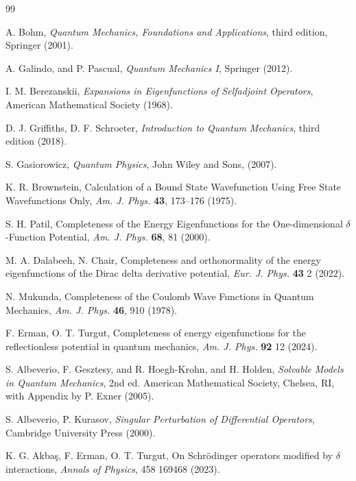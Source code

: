 \documentclass[amsmath,amssymb,14pt]{article}
\numberwithin{equation}{section}
\begin{document}
\begin{thebibliography}{99}



 A. Bohm, \textit{Quantum Mechanics, Foundations and Applications}, third edition, Springer (2001). 

 A. Galindo, and P. Pascual, \textit{Quantum Mechanics I}, Springer (2012).

 I. M. Berezanskii, \textit{Expansions in Eigenfunctions of Selfadjoint Operators}, American Mathematical Society (1968).

 D. J. Griffiths, D. F. Schroeter, \textit{Introduction to Quantum Mechanics}, third edition (2018). 

 S. Gasiorowicz, \textit{Quantum Physics}, John Wiley and Sons, (2007).

 K. R. Brownstein, Calculation of a Bound State Wavefunction Using Free State Wavefunctions Only, \textit{Am. J. Phys.} \textbf{43}, 173–176 (1975).

 S. H. Patil, Completeness of the Energy Eigenfunctions for the One-dimensional $\delta$-Function
Potential, \textit{Am. J. Phys.} \textbf{68}, 81 (2000).

 M. A. Dalabeeh, N. Chair, Completeness and orthonormality of the energy eigenfunctions of the Dirac delta derivative potential, \textit{Eur. J. Phys.} \textbf{43} 2 (2022).


 N. Mukunda, Completeness of the Coulomb Wave Functions in Quantum
Mechanics, \textit{Am. J. Phys.} \textbf{46}, 910 (1978).


 F. Erman, O. T. Turgut, Completeness of energy eigenfunctions for the reflectionless potential in quantum mechanics, \textit{Am. J. Phys.} \textbf{92} 12 (2024).

 S. Albeverio, F. Gesztesy, and R. Hoegh-Krohn, and H. Holden, \textit{Solvable Models in Quantum Mechanics}, 2nd ed. American Mathematical Society, Chelsea, RI, with Appendix by P. Exner (2005).

 S. Albeverio, P. Kurasov, \textit{Singular Perturbation of Differential Operators}, Cambridge University Press (2000).

 K. G. Akba\c{s}, F. Erman, O. T. Turgut, On Schr\"{o}dinger operators modified by $\delta$ interactions, \textit{Annals of Physics}, 458 169468 (2023).




\end{thebibliography}
\end{document}

